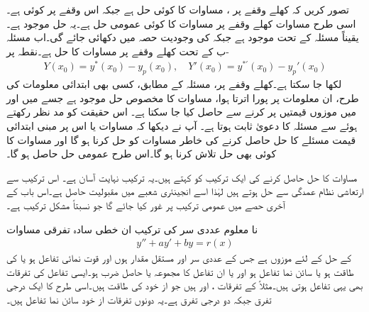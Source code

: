 تصور کریں کہ کھلے وقفے  پر ،  مساوات  کا کوئی حل ہے جبکہ  اس وقفے پر کوئی  ہے۔اسی طرح مساوات  کھلے وقفے پر مساوات  کا کوئی عمومی حل ہے۔یہ حل موجود ہے۔یقیناً  مسئلہ  کے تحت موجود ہے جبکہ  کی وجودیت حصہ  میں  دکھائی جائے گی۔اب مسئلہ -ب کے تحت   کھلے وقفے پر مساوات  کا حل ہے۔نقطہ  پر
\begin{align*}
Y(x_0)=y^*(x_0)-y_p(x_0), \quad Y'(x_0)=y^{*'}(x_0)-y_p'(x_0)
\end{align*}
لکھا جا سکتا ہے۔کھلے وقفے   پر، مسئلہ  کے مطابق، کسی بھی ابتدائی معلومات کی طرح، ان معلومات پر پورا اترتا ہوا، مساوات  کا مخصوص حل موجود ہے جسے  میں  اور  میں موزوں  قیمتیں پر کرنے سے حاصل کیا جا سکتا ہے۔  اس حقیقت کو مد نظر رکھتے ہوئے   سے مسئلہ کا دعویٰ ثابت ہوتا ہے۔
آپ نے دیکھا کہ مساوات  یا اس پر مبنی ابتدائی قیمت مسئلے کا حل  حاصل کرنے کی خاطر مساوات  کو حل کرنا ہو گا اور مساوات  کا کوئی بھی حل   تلاش کرنا ہو گا۔اس طرح عمومی حل  حاصل ہو گا۔

مساوات  کا حل  حاصل کرنے کی ایک ترکیب کو   کہتے ہیں۔یہ ترکیب نہایت آسان ہے۔ اس ترکیب سے ارتعاشی نظام عمدگی سے حل ہوتے ہیں لہٰذا اسے انجینئری شعبے میں مقبولیت حاصل ہے۔اس باب کے آخری حصے میں عمومی ترکیب پر غور کیا جائے گا جو نسبتاً مشکل ترکیب ہے۔

نا معلوم عددی سر کی ترکیب ان خطی سادہ تفرقی مساوات
\begin{align}\label{مساوات_سادہ_دو_نا_معلوم_الف}
y''+ay'+by=r(x)
\end{align}
 کے حل کے لئے موزوں ہے جس کے عددی سر  اور  مستقل مقدار ہوں اور  قوت نمائی تفاعل ہو یا  کی طاقت ہو یا  سائن نما تفاعل ہو اور یا ان تفاعل کا مجموعہ یا حاصل ضرب ہو۔ایسی تفاعل کی تفرقات بھی یہی تفاعل ہوتی ہیں۔مثلاً  کے تفرقات   ،  اور  ہیں جو از خود  کی طاقت ہیں۔اسی طرح  کا ایک درجی تفرق  جبکہ دو درجی تفرق  ہے۔یہ دونوں تفرقات از خود  سائن نما تفاعل ہیں۔

